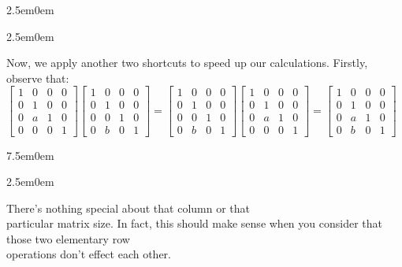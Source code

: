 \documentclass{book}
\newcommand{\hFour}{%
   \color{Cerulean}
   \fontsize{12}{14}\selectfont%
}
\newenvironment{myIndent}{%
   \begin{adjustwidth}{2.5em}{0em}%
}{%
   \end{adjustwidth}%
}
\newenvironment{myTindent}{%
   \begin{adjustwidth}{7.5em}{0em}%
}{%
   \end{adjustwidth}%
}
\newcommand{\retTwo}{\hfill\bigbreak}
\begin{document}
\begin{myIndent}
{\begin{myIndent}
         Now, we apply another two shortcuts to speed up our calculations. \retTwo Firstly, observe that:
         $
         \left[\begin{smallmatrix}
            1 & 0 & 0 & 0 \\
            0 & 1 & 0 & 0 \\
            0 & a & 1 & 0 \\
            0 & 0 & 0 & 1
         \end{smallmatrix}\right]
         \left[\begin{smallmatrix}
            1 & 0 & 0 & 0 \\
            0 & 1 & 0 & 0 \\
            0 & 0 & 1 & 0 \\
            0 & b & 0 & 1
         \end{smallmatrix}\right] = \left[\begin{smallmatrix}
            1 & 0 & 0 & 0 \\
            0 & 1 & 0 & 0 \\
            0 & 0 & 1 & 0 \\
            0 & b & 0 & 1
         \end{smallmatrix}\right]
         \left[\begin{smallmatrix}
            1 & 0 & 0 & 0 \\
            0 & 1 & 0 & 0 \\
            0 & a & 1 & 0 \\
            0 & 0 & 0 & 1
         \end{smallmatrix}\right] = \left[\begin{smallmatrix}
            1 & 0 & 0 & 0 \\
            0 & 1 & 0 & 0 \\
            0 & a & 1 & 0 \\
            0 & b & 0 & 1
         \end{smallmatrix}\right]$
         
         {\begin{myTindent}\begin{myIndent} \hFour
            There's nothing special about that column or that \\particular matrix size. In fact, this should make sense when you consider that those two elementary row \\operations don't effect each other.
         \end{myIndent}\end{myTindent}} \retTwo


\end{myIndent}}
\end{myIndent}
\end{document}
